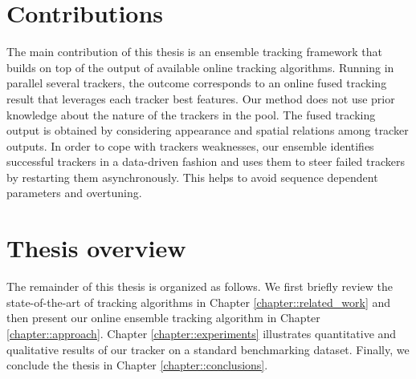 \section{Contributions}

The main contribution of this thesis is an ensemble tracking
framework that builds on top of the output of available online tracking
algorithms. Running in parallel several trackers, the outcome corresponds to
an online fused tracking result that
leverages each tracker best features. Our method does not use prior knowledge
about the nature of the trackers in the pool.
The fused tracking output is obtained by considering appearance and spatial
relations among tracker outputs.
In order to cope with trackers weaknesses,
our ensemble identifies successful trackers in a data-driven fashion
and uses them to steer failed trackers by restarting them asynchronously.
This helps to avoid sequence dependent parameters and overtuning.

\section{Thesis overview}

The remainder of this thesis is organized as follows.
We first briefly review the state-of-the-art of tracking algorithms
in Chapter \ref{chapter::related_work} and
then present our online ensemble tracking algorithm
in Chapter \ref{chapter::approach}.
Chapter \ref{chapter::experiments} illustrates quantitative and qualitative results of our
tracker on a standard benchmarking dataset.
Finally, we conclude the thesis in Chapter \ref{chapter::conclusions}.